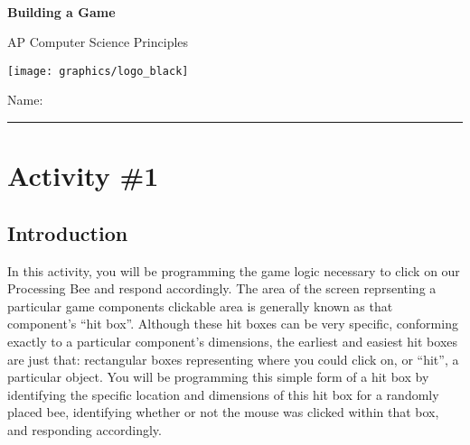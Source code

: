 

\def\LabCourse{AP Computer Science Principles}
\def\LabNumber{01}
\def\LabTitle{Building a Game}


	\begin{coverpages}
		\ \\[2cm]
		\begin{center}
			\huge
			\textbf{\LabTitle}

			\Large
			\LabCourse
		\end{center}

		\vspace{1.5cm}

		\begin{center}
			\texttt{[image: graphics/logo\_black]}

			\vspace{2.5cm}

			\Large
			Name: \rule{11.5cm}{0.1pt}
		\end{center}
	\end{coverpages}

	\blankpage

	\thispagestyle{empty}
	\tableofcontents

	\pagebreak

	\section{Activity \#1}
	\subsection{Introduction}
		In this activity, you will be programming the game logic necessary to click on our Processing Bee and respond accordingly. The area of the screen reprsenting a particular game components clickable area is generally known as that component's ``hit box''. Although these hit boxes can be very specific, conforming exactly to a particular component's dimensions, the earliest and easiest hit boxes are just that: rectangular boxes representing where you could click on, or ``hit'', a particular object. You will be programming this simple form of a hit box by identifying the specific location and dimensions of this hit box for a randomly placed bee, identifying whether or not the mouse was clicked within that box, and responding accordingly.

